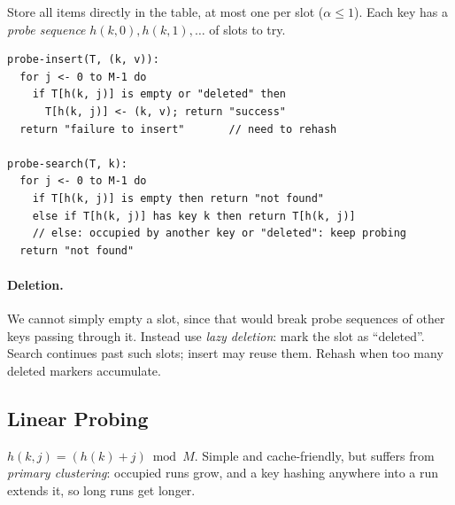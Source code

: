 Store all items directly in the table, at most one per slot ($\alpha \le 1$).
Each key has a \emph{probe sequence} $h(k, 0), h(k, 1), \ldots$ of slots to try.
\begin{lstlisting}
probe-insert(T, (k, v)):
  for j <- 0 to M-1 do
    if T[h(k, j)] is empty or "deleted" then
      T[h(k, j)] <- (k, v); return "success"
  return "failure to insert"       // need to rehash

probe-search(T, k):
  for j <- 0 to M-1 do
    if T[h(k, j)] is empty then return "not found"
    else if T[h(k, j)] has key k then return T[h(k, j)]
    // else: occupied by another key or "deleted": keep probing
  return "not found"
\end{lstlisting}

\paragraph{Deletion.} We cannot simply empty a slot, since that would break
probe sequences of other keys passing through it. Instead use \emph{lazy
deletion}: mark the slot as ``deleted''. Search continues past such slots;
insert may reuse them. Rehash when too many deleted markers accumulate.

\subsection{Linear Probing}

$h(k, j) = (h(k) + j) \bmod M$. Simple and cache-friendly, but suffers from
\emph{primary clustering}: occupied runs grow, and a key hashing anywhere into a
run extends it, so long runs get longer.

